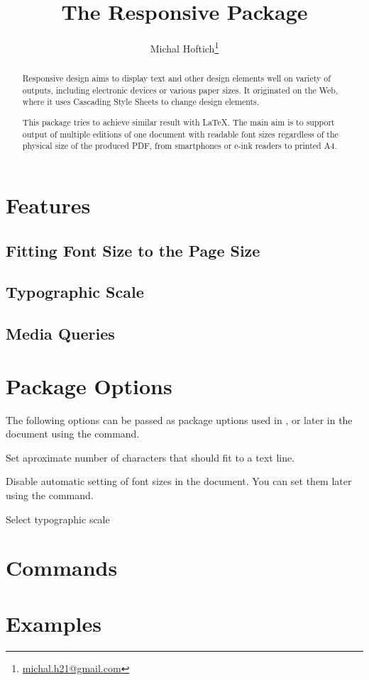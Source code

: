 \documentclass{ltxdoc}
\title{The Responsive Package}
\author{Michal Hoftich\thanks{\url{michal.h21@gmail.com}}}
\begin{document}
\maketitle
\begin{abstract}
Responsive design aims to display text and other design elements well on
variety of outputs, including electronic devices or various paper sizes.
It originated on the Web, where it uses Cascading Style Sheets to change 
design elements. 

This package tries to achieve similar result with \LaTeX. The main aim is to 
support output of multiple editions of one document with 
readable font sizes regardless of the physical size of the produced PDF,
from smartphones or e-ink readers to printed A4.
\end{abstract}
\tableofcontents

\section{Features}

\subsection{Fitting Font Size to the Page Size}

\subsection{Typographic Scale}

\subsection{Media Queries}

\section{Package Options}

The following options can be passed as package uptions used in \cmd{\usepackage}, 
or later in the document using the \cmd{\ResponsiveSetup} command.

\medskip

\noindent {} Set aproximate number of characters that should fit to a text line.

\noindent {}  Disable automatic setting of font sizes in the document. You can set them 
later using the \cmd{\setsizes} command.

\noindent {} Select typographic scale




\section{Commands}

\DescribeMacro\setsizes
\cmd\setsizes{}


\section{Examples}
\end{document}

